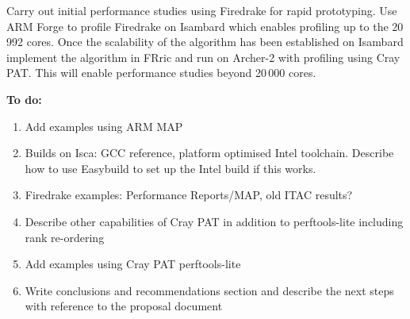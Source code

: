 \documentclass[a4paper,titlepage]{article}
\begin{document}
Carry out initial performance studies using Firedrake for rapid prototyping. Use ARM Forge to profile Firedrake on Isambard which enables profiling up to the 20\,992 cores. Once the scalability of the algorithm has been established on Isambard implement the algorithm in FRric and run on Archer-2 with profiling using Cray PAT. This will enable performance studies beyond 20\,000 cores.

\noindent
\textbf{To do:}

\begin{enumerate}
\item Add examples using ARM MAP
\item Builds on Isca: GCC reference, platform optimised Intel toolchain. Describe how to use Easybuild to set up the Intel build if this works.
\item Firedrake examples: Performance Reports/MAP, old ITAC results?
\item Describe other capabilities of Cray PAT in addition to perftools-lite including rank re-ordering
\item Add examples using Cray PAT perftools-lite
\item Write conclusions and recommendations section and describe the next steps with reference to the proposal document
\end{enumerate}

\pagebreak

\end{document}
